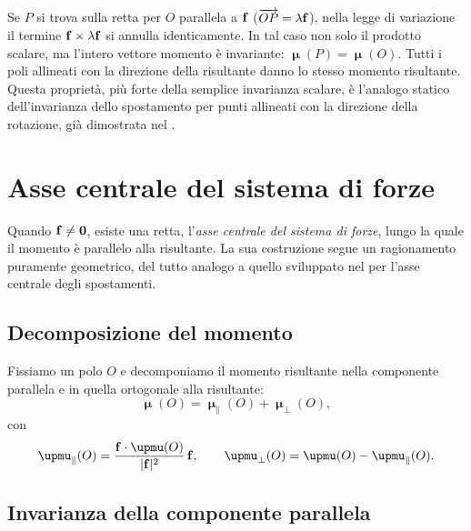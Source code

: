 \begin{oss}
	Se $P$ si trova sulla retta per $O$ parallela a $\mathbf{f}$
	($\overrightarrow{OP} = \lambda\mathbf{f}$), nella
	legge di variazione il termine $\mathbf{f} \times \lambda\mathbf{f}$
	si annulla identicamente. In tal caso non solo il prodotto
	scalare, ma l'intero vettore momento è invariante:
	$\bm{\upmu}(P) = \bm{\upmu}(O)$. Tutti i poli allineati
	con la direzione della risultante danno lo stesso momento
	risultante. Questa proprietà, più forte della semplice
	invarianza scalare, è l'analogo statico dell'invarianza
	dello spostamento per punti allineati con la direzione
	della rotazione, già dimostrata nel .
\end{oss}

\section{Asse centrale del sistema di forze}

Quando $\mathbf{f} \neq \mathbf{0}$, esiste una retta, l'\textit{asse
	centrale del sistema di forze}, lungo la quale il momento è
parallelo alla risultante. La sua costruzione segue un
ragionamento puramente geometrico, del tutto analogo a quello
sviluppato nel  per l'asse centrale degli
spostamenti.

\subsection{Decomposizione del momento}

Fissiamo un polo $O$ e decomponiamo il momento risultante
nella componente parallela e in quella ortogonale alla
risultante:
\begin{equation}\label{eq:decomp_momento}
	\bm{\upmu}(O) = \bm{\upmu}_{\parallel}(O)
	+ \bm{\upmu}_{\perp}(O),
\end{equation}
con
\begin{equation}
	\bm{\upmu}_{\parallel}(O)
	= \frac{\fb \cdot \bm{\upmu}(O)}{|\fb|^2}\,\fb,
	\qquad
	\bm{\upmu}_{\perp}(O)
	= \bm{\upmu}(O) - \bm{\upmu}_{\parallel}(O).
\end{equation}

\subsection{Invarianza della componente parallela}

